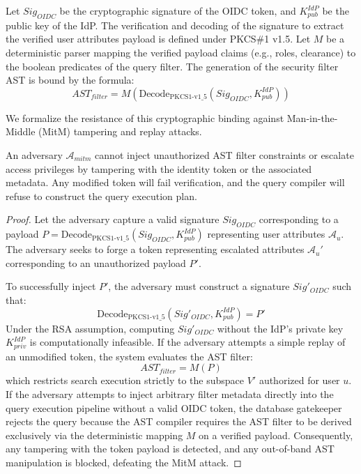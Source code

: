 \documentclass[sigconf]{acmart}
\begin{document}
Let $Sig_{OIDC}$ be the cryptographic signature of the OIDC token, and $K_{pub}^{IdP}$ be the public key of the IdP. The verification and decoding of the signature to extract the verified user attributes payload is defined under PKCS\#1 v1.5. Let $M$ be a deterministic parser mapping the verified payload claims (e.g., roles, clearance) to the boolean predicates of the query filter. The generation of the security filter AST is bound by the formula:
\begin{equation}
    AST_{filter} = M(\text{Decode}_{\text{PKCS1-v1\_5}}(Sig_{OIDC}, K_{pub}^{IdP}))
\end{equation}

We formalize the resistance of this cryptographic binding against Man-in-the-Middle (MitM) tampering and replay attacks.

\begin{theorem}
An adversary $\mathcal{A}_{mitm}$ cannot inject unauthorized AST filter constraints or escalate access privileges by tampering with the identity token or the associated metadata. Any modified token will fail verification, and the query compiler will refuse to construct the query execution plan.
\end{theorem}

\begin{proof}
Let the adversary capture a valid signature $Sig_{OIDC}$ corresponding to a payload $P = \text{Decode}_{\text{PKCS1-v1\_5}}(Sig_{OIDC}, K_{pub}^{IdP})$ representing user attributes $\mathcal{A}_u$. The adversary seeks to forge a token representing escalated attributes $\mathcal{A}_u'$ corresponding to an unauthorized payload $P'$.

To successfully inject $P'$, the adversary must construct a signature $Sig'_{OIDC}$ such that:
\begin{equation}
    \text{Decode}_{\text{PKCS1-v1\_5}}(Sig'_{OIDC}, K_{pub}^{IdP}) = P'
\end{equation}
Under the RSA assumption, computing $Sig'_{OIDC}$ without the IdP's private key $K_{priv}^{IdP}$ is computationally infeasible. If the adversary attempts a simple replay of an unmodified token, the system evaluates the AST filter:
\begin{equation}
    AST_{filter} = M(P)
\end{equation}
which restricts search execution strictly to the subspace $V'$ authorized for user $u$. If the adversary attempts to inject arbitrary filter metadata directly into the query execution pipeline without a valid OIDC token, the database gatekeeper rejects the query because the AST compiler requires the AST filter to be derived exclusively via the deterministic mapping $M$ on a verified payload. Consequently, any tampering with the token payload is detected, and any out-of-band AST manipulation is blocked, defeating the MitM attack.
\end{proof}
\end{document}
